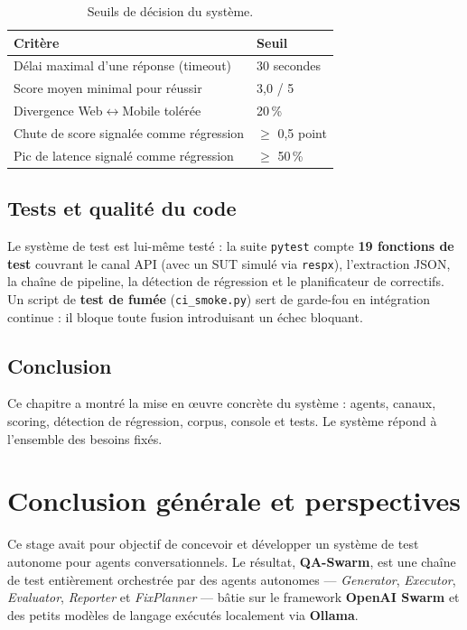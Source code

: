 \documentclass[12pt,a4paper,oneside]{report}
\begin{document}
\begin{table}[H]
\centering
\caption{Seuils de décision du système.}
\label{tab:thresholds}
\renewcommand{\arraystretch}{1.3}
\begin{tabularx}{\textwidth}{@{}X l@{}}
\toprule
\textbf{Critère} & \textbf{Seuil} \\
\midrule
Délai maximal d'une réponse (timeout) & 30 secondes \\
Score moyen minimal pour réussir & 3,0 / 5 \\
Divergence Web$\leftrightarrow$Mobile tolérée & 20\,\% \\
Chute de score signalée comme régression & $\geq$ 0,5 point \\
Pic de latence signalé comme régression & $\geq$ 50\,\% \\
\bottomrule
\end{tabularx}
\end{table}

\section{Tests et qualité du code}
Le système de test est lui-même testé : la suite \texttt{pytest} compte
\textbf{19 fonctions de test} couvrant le canal API (avec un SUT simulé via
\texttt{respx}), l'extraction JSON, la chaîne de pipeline, la détection de régression
et le planificateur de correctifs. Un script de \textbf{test de fumée} (\texttt{ci\_smoke.py})
sert de garde-fou en intégration continue : il bloque toute fusion introduisant un
échec bloquant.

\section{Conclusion}
Ce chapitre a montré la mise en œuvre concrète du système : agents, canaux, scoring,
détection de régression, corpus, console et tests. Le système répond à l'ensemble des
besoins fixés.

\chapter*{Conclusion générale et perspectives}

Ce stage avait pour objectif de concevoir et développer un système de test autonome
pour agents conversationnels. Le résultat, \textbf{QA-Swarm}, est une chaîne de test
entièrement orchestrée par des agents autonomes — \textit{Generator}, \textit{Executor},
\textit{Evaluator}, \textit{Reporter} et \textit{FixPlanner} — bâtie sur le framework
\textbf{OpenAI Swarm} et des petits modèles de langage exécutés localement via
\textbf{Ollama}.
\end{document}
